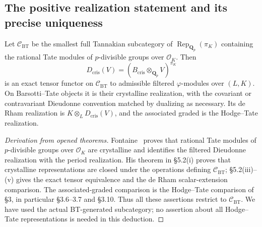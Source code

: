 \subsection{The positive realization statement and its precise uniqueness}
\begin{theorem}\label{cat:J5}
Let $\mathcal C_{\mathrm{BT}}$ be the smallest full Tannakian subcategory
of $\operatorname{Rep}_{\mathbf Q_p}(\pi_K)$ containing the rational
Tate modules of $p$-divisible groups over $\mathcal O_K$.
Then
\[
 D_{\mathrm{cris}}(V)=
 (B_{\mathrm{cris}}\otimes_{\mathbf Q_p}V)^{\pi_K}
\]
is an exact tensor functor on $\mathcal C_{\mathrm{BT}}$ to admissible
filtered $\varphi$-modules over $(L,K)$.  On Barsotti--Tate objects it
is their crystalline realization, with the covariant or contravariant
Dieudonne convention matched by dualizing as necessary.  Its de Rham
realization is $K\otimes_LD_{\mathrm{cris}}(V)$, and the associated
graded is the Hodge--Tate realization.
\end{theorem}
\begin{proof}[Derivation from opened theorems]
Fontaine~\cite[\S6.2]{catFontaine1982} proves that rational Tate
modules of $p$-divisible groups over $\mathcal O_K$ are crystalline
and identifies the filtered Dieudonne realization with the period
realization.  His theorem in \S5.2(i) proves that crystalline
representations are closed under the operations defining
$\mathcal C_{\mathrm{BT}}$; \S5.2(iii)--(v) gives the exact tensor
equivalence and the de Rham scalar-extension comparison.
The associated-graded comparison is the Hodge--Tate comparison of
\S3, in particular \S3.6--3.7 and \S3.10.  Thus all these assertions restrict to
$\mathcal C_{\mathrm{BT}}$.  We have used the actual BT-generated
subcategory; no assertion about all Hodge--Tate representations is
needed in this deduction.
\end{proof}

